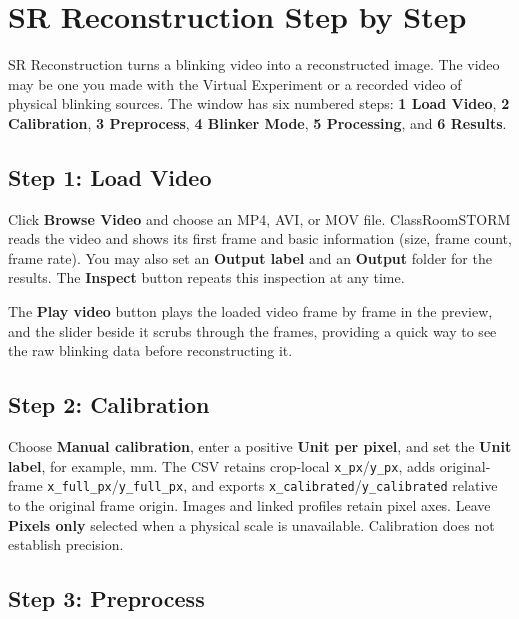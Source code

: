 \documentclass[11pt,a4paper]{article}
\newcommand{\ui}[1]{\textbf{#1}}
\newcommand{\file}[1]{\texttt{#1}}
\newcommand{\app}{ClassRoomSTORM}
\begin{document}
\section{SR Reconstruction Step by Step}
\label{sec:recon}

SR Reconstruction turns a blinking video into a reconstructed image. The video
may be one you made with the Virtual Experiment or a recorded video of physical blinking sources. The window has six numbered steps: \ui{1 Load Video}, \ui{2 Calibration},
\ui{3 Preprocess}, \ui{4 Blinker Mode}, \ui{5 Processing}, and \ui{6 Results}.

\subsection{Step 1: Load Video}
\label{sec:rc-load}

Click \ui{Browse Video} and choose an MP4, AVI, or MOV file. \app{} reads the
video and shows its first frame and basic information (size, frame count, frame
rate). You may also set an \ui{Output label} and an \ui{Output} folder for the
results. The \ui{Inspect} button repeats this inspection at any time.

The \ui{Play video} button plays the loaded video frame by frame in the
preview, and the slider beside it scrubs through the frames, providing a quick way to
see the raw blinking data before reconstructing it.

\subsection{Step 2: Calibration}
\label{sec:rc-calib}

\begin{csnote}
Choose \ui{Manual calibration}, enter a positive \ui{Unit per pixel}, and set
the \ui{Unit label}, for example, mm. The CSV retains crop-local
\file{x\_px}/\file{y\_px}, adds original-frame
\file{x\_full\_px}/\file{y\_full\_px}, and exports
\file{x\_calibrated}/\file{y\_calibrated} relative to the original frame origin.
Images and linked profiles retain pixel axes. Leave \ui{Pixels only} selected
when a physical scale is unavailable. Calibration does not establish precision.
\end{csnote}

\subsection{Step 3: Preprocess}
\label{sec:rc-preprocess}
\end{document}
